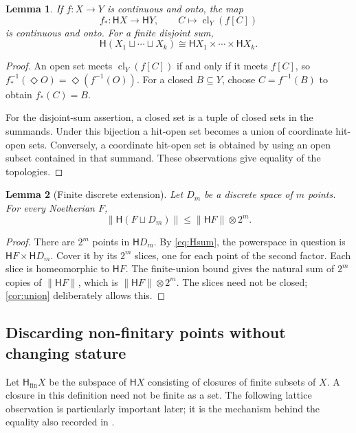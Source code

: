 \documentclass[11pt,a4paper]{article}
\newtheorem{lemma}[lemma]{Lemma}
\theoremstyle{definition}
\newcommand{\HH}{\mathsf H}
\newcommand{\Hfin}{\mathsf H_{\mathrm{fin}}}
\newcommand{\st}[1]{\lVert #1\rVert}
\newcommand{\cl}{\operatorname{cl}}
\newcommand{\ds}{\mathbin{\sqcup}}
\numberwithin{equation}{section}
\begin{document}
\begin{lemma}\label{lem:functor}
If $f:X\to Y$ is continuous and onto, the map
\[
 f_*:\HH X\longrightarrow\HH Y,\qquad C\longmapsto\cl_Y(f[C])
\]
is continuous and onto.  For a finite disjoint sum,
\begin{equation}\label{eq:Hsum}
 \HH(X_1\ds\cdots\ds X_k)\cong\HH X_1\times\cdots\times\HH X_k.
\end{equation}
\end{lemma}
\begin{proof}
An open set meets $\cl_Y(f[C])$ if and only if it meets $f[C]$, so
$f_*^{-1}(\Diamond O)=\Diamond(f^{-1}(O))$.  For a closed $B\subseteq Y$,
choose $C=f^{-1}(B)$ to obtain $f_*(C)=B$.

For the disjoint-sum assertion, a closed set is a tuple of closed sets
in the summands.  Under this bijection a hit-open set becomes a union
of coordinate hit-open sets.  Conversely, a coordinate hit-open set is
obtained by using an open subset contained in that summand.  These
observations give equality of the topologies.
\end{proof}

\begin{lemma}[Finite discrete extension]\label{lem:discrete}
Let $D_m$ be a discrete space of $m$ points.  For every Noetherian $F$,
\[
 \st{\HH(F\ds D_m)}\leq\st{\HH F}\otimes 2^m.
\]
\end{lemma}
\begin{proof}
There are $2^m$ points in $\HH D_m$.  By \eqref{eq:Hsum}, the powerspace
in question is $\HH F\times\HH D_m$.  Cover it by its $2^m$ slices,
one for each point of the second factor.  Each slice is homeomorphic
to $\HH F$.  The finite-union bound gives the natural sum of $2^m$
copies of $\st{\HH F}$, which is $\st{\HH F}\otimes2^m$.
The slices need not be closed; \cref{cor:union} deliberately allows this.
\end{proof}

\subsection{Discarding non-finitary points without changing stature}

Let $\Hfin X$ be the subspace of $\HH X$ consisting of closures of finite
subsets of $X$.  A closure in this definition need not be finite as a set.
The following lattice observation is particularly important later; it is
the mechanism behind the equality also recorded in
\cite[Proposition~11.4]{GL23}.
\end{document}
